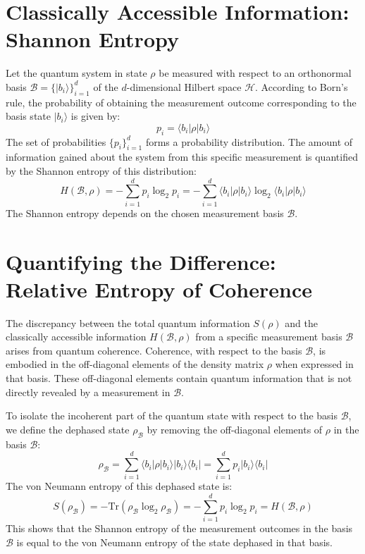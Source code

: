 	\section{Classically Accessible Information: Shannon Entropy}
	
	Let the quantum system in state $\rho$ be measured with respect to an orthonormal basis $\mathcal{B} = \{|b_i\rangle\}_{i=1}^d$ of the $d$-dimensional Hilbert space $\mathcal{H}$. According to Born's rule, the probability of obtaining the measurement outcome corresponding to the basis state $|b_i\rangle$ is given by:
	\begin{equation}
		p_i = \langle b_i|\rho|b_i\rangle
		\label{eq:born_rule}
	\end{equation}
	The set of probabilities $\{p_i\}_{i=1}^d$ forms a probability distribution. The amount of information gained about the system from this specific measurement is quantified by the Shannon entropy of this distribution:
	\begin{equation}
		H(\mathcal{B}, \rho) = -\sum_{i=1}^d p_i \log_2 p_i = -\sum_{i=1}^d \langle b_i|\rho|b_i\rangle \log_2 \langle b_i|\rho|b_i\rangle
		\label{eq:shannon_entropy}
	\end{equation}
	The Shannon entropy depends on the chosen measurement basis $\mathcal{B}$.
	
	\section{Quantifying the Difference: Relative Entropy of Coherence}
	
	The discrepancy between the total quantum information $S(\rho)$ and the classically accessible information $H(\mathcal{B}, \rho)$ from a specific measurement basis $\mathcal{B}$ arises from quantum coherence. Coherence, with respect to the basis $\mathcal{B}$, is embodied in the off-diagonal elements of the density matrix $\rho$ when expressed in that basis. These off-diagonal elements contain quantum information that is not directly revealed by a measurement in $\mathcal{B}$.
	
	To isolate the incoherent part of the quantum state with respect to the basis $\mathcal{B}$, we define the dephased state $\rho_{\mathcal{B}}$ by removing the off-diagonal elements of $\rho$ in the basis $\mathcal{B}$:
	\begin{equation}
		\rho_{\mathcal{B}} = \sum_{i=1}^d \langle b_i|\rho|b_i\rangle |b_i\rangle\langle b_i| = \sum_{i=1}^d p_i |b_i\rangle\langle b_i|
		\label{eq:dephased_state}
	\end{equation}
	The von Neumann entropy of this dephased state is:
	\begin{equation}
		S(\rho_{\mathcal{B}}) = -\text{Tr}(\rho_{\mathcal{B}} \log_2 \rho_{\mathcal{B}}) = -\sum_{i=1}^d p_i \log_2 p_i = H(\mathcal{B}, \rho)
		\label{eq:entropy_dephased_state}
	\end{equation}
	This shows that the Shannon entropy of the measurement outcomes in the basis $\mathcal{B}$ is equal to the von Neumann entropy of the state dephased in that basis.
	
